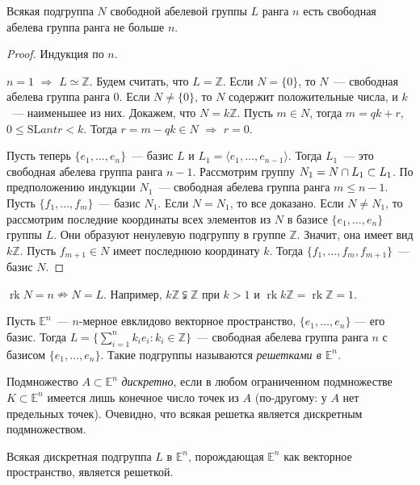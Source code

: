 \documentclass[a4paper]{article}
\renewcommand{\rk}{\mathop{\mathrm{rk}}\nolimits}
\newcommand*{\p}[1]{#1\nobreak\discretionary{}{\hbox{$\mathsurround=0pt #1$}}{}}
\begin{document}
\begin{theorem}
\label{1.IV}Всякая подгруппа $N$ свободной абелевой группы $L$ ранга
$n$ есть свободная абелева группа ранга не больше $n$.
\end{theorem}

\begin{proof}
Индукция по $n$.

$n=1$ $\Rightarrow$ $L\simeq\mathbb{Z}$. Будем считать, что
$L=\mathbb{Z}$. Если $N=\{0\}$, то $N$~--- свободная абелева группа
ранга 0. Если $N\neq\{0\}$, то $N$ содержит положительные числа, и
$k$~--- наименьшее из них. Докажем, что $N=k\mathbb{Z}$. Пусть $m\in
N$, тогда $m=qk+r$, $0\leq\mathrm{SL}ant r<k$. Тогда $r=m-qk\in N$
$\Rightarrow$ $r=0$.

Пусть теперь $\{e_1,\ldots,e_n\}$~--- базис $L$ и $L_1=\langle
e_1,\ldots,e_{n-1}\rangle$. Тогда $L_1$~--- это свободная абелева
группа ранга $n-1$. Рассмотрим группу $N_1\p=N\p\cap L_1\subset
L_1$. По предположению индукции $N_1$~--- свободная абелева группа
ранга $m\leqslant n-1$. Пусть $\{f_1,\ldots,f_m\}$~--- базис $N_1$.
Если $N=N_1$, то все доказано. Если $N\neq N_1$, то рассмотрим
последние координаты всех элементов из $N$ в базисе
$\{e_1,\ldots,e_n\}$ группы $L$. Они образуют ненулевую подгруппу в
группе $\mathbb{Z}$. Значит, она имеет вид $k\mathbb{Z}$. Пусть
$f_{m+1}\in N$ имеет последнюю координату $k$. Тогда
$\{f_1,\ldots,f_m,f_{m+1}\}$~--- базис $N$.
\end{proof}

\begin{note}
$\rk N=n\nRightarrow N=L$. Например, $k\mathbb{Z}\subsetneqq
\mathbb{Z}$ при $k>1$ и $\rk k\mathbb{Z}=\rk\mathbb{Z}=1$.
\end{note}

Пусть $\mathbb{E}^n$~--- $n$-мерное евклидово векторное
пространство, $\{e_1,\ldots,e_n\}$ --- его базис. Тогда
$L=\Big\{\sum\limits_{i=1}^n k_ie_i: k_i\in\mathbb{Z}\Big\}$~---
свободная абелева группа ранга $n$ с базисом $\{e_1,\ldots,e_n\}$.
Такие подгруппы называются \emph{решетками в $\mathbb{E}^n$}.

Подмножество $A\subset\mathbb{E}^n$ \emph{дискретно}, если в любом
ограниченном подмножестве $K\subset\mathbb{E}^n$ имеется лишь
конечное число точек из $A$ (по-другому: у $A$ нет предельных
точек). Очевидно, что всякая решетка является дискретным
подмножеством.

\begin{theorem}
\label{2.IV}Всякая дискретная подгруппа $L$ в $\mathbb{E}^n$,
порождающая $\mathbb{E}^n$ как векторное пространство, является
решеткой.
\end{theorem}
\end{document}
